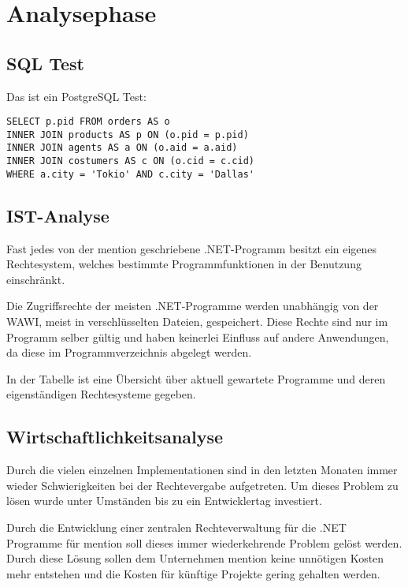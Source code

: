 \section{Analysephase}
\label{sec:Analysephase}

\subsection{SQL Test}
\label{sec:SQL Test}
\lstset{language=SQL,numbers=none}
Das ist ein PostgreSQL Test: \\
\begin{lstlisting}
SELECT p.pid FROM orders AS o 
INNER JOIN products AS p ON (o.pid = p.pid)
INNER JOIN agents AS a ON (o.aid = a.aid)
INNER JOIN costumers AS c ON (o.cid = c.cid)
WHERE a.city = 'Tokio' AND c.city = 'Dallas'
\end{lstlisting}

\subsection{IST-Analyse}
\label{sec:IstAnalyse}

Fast jedes von der \acl{mention} geschriebene .NET-Programm besitzt ein eigenes
Rechtesystem, welches bestimmte Programmfunktionen in der Benutzung einschränkt.

Die Zugriffsrechte der meisten .NET-Programme werden unabhängig von der
\acs{WAWI}, meist in verschlüsselten  Dateien, gespeichert. Diese
Rechte sind nur im Programm selber gültig und haben keinerlei Einfluss auf
andere Anwendungen, da diese im Programmverzeichnis abgelegt werden.

In der Tabelle  ist eine
Übersicht über aktuell gewartete Programme und deren eigenständigen
Rechtesysteme gegeben.\\


\subsection{Wirtschaftlichkeitsanalyse}
\label{sec:Wirtschaftlichkeitsanalyse}
Durch die vielen einzelnen Implementationen sind in den letzten Monaten
immer wieder Schwierigkeiten bei der Rechtevergabe aufgetreten. Um dieses
Problem zu lösen wurde unter Umständen bis zu ein Entwicklertag
investiert.

Durch die Entwicklung einer zentralen Rechteverwaltung für die .NET
Programme für \ac{mention} soll dieses immer wiederkehrende Problem
gelöst werden.
Durch diese Lösung sollen dem Unternehmen \ac{mention}
keine unnötigen Kosten mehr entstehen und die Kosten für künftige Projekte
gering gehalten werden.\\

